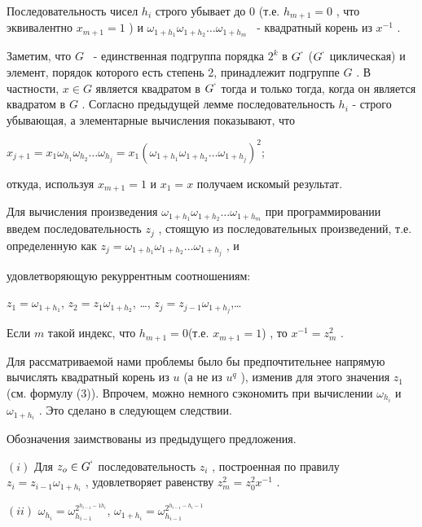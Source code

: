 \documentclass{mai_book}
\begin{document}
Последовательность чисел $h_i$
 строго убывает до 0 (т.е. $h_{m+1}=0$
    , что эквивалентно $x_{m+1}=1$
) и $\omega_{1+h_1}\omega_{1+h_2}\ldots\omega_{1+h_m}$
 ~- квадратный корень из $x^{-1}$
 .


\begin{myproof}
Заметим, что $G$
 ~- единственная подгруппа порядка $2^k$
 в $G^`$
 ($G^`$
 циклическая) и элемент, порядок которого есть степень 2, принадлежит подгруппе $G$
 . В частности, $x\in G$
 является квадратом в $G^`$
 тогда и только тогда, когда он является квадратом в $G$
 .
Согласно предыдущей лемме последовательность $h_i$
 - строго убывающая, а элементарные вычисления показывают, что

\begin{center}
$x_{j+1}= x_1\omega_{h_1}\omega_{h_2}\ldots\omega_{h_j} = x_1(\omega_{1+h_1}\omega_{1+h_2}\ldots\omega_{1+h_j})^2$;
\end{center}


откуда, используя $x_{m+1}=1$
 и $x_1=x$
 получаем искомый результат.
\end{myproof}

Для вычисления произведения $\omega_{1+h_1}\omega_{1+h_2}\ldots\omega_{1+h_m}$
 при программировании введем последовательность $z_j$
 , стоящую из последовательных произведений, т.е. определенную как $z_j = \omega_{1+h_1}\omega_{1+h_2}\ldots\omega_{1+h_j}$
, и

\newpage

удовлетворяющую рекуррентным соотношениям:

\begin{center}
$z_1 = \omega_{1+h_1}$, $z_2=z_1\omega_{1+h_2}$, \ldots, $z_j=z_{j-1}\omega_{1+h_j}$,\ldots
\end{center}


Если $m$
 такой индекс, что $h_{m+1}=0$(т.е. $x_{m+1}=1$)
 , то $x^{-1}=z_m^2$
.

Для рассматриваемой нами проблемы было бы предпочтительнее напрямую вычислять квадратный корень из $u$
 (а не из $u^q$
    ), изменив для этого значения $z_1$
 (см. формулу (3)). Впрочем, можно немного сэкономить при вычислении $\omega_{h_i}$
 и $\omega_{1+h_i}$
 . Это сделано в следующем следствии.

\begin{sled}
Обозначения заимствованы из предыдущего предложения.

$(i)$ Для $z_o\in G^`$
 последовательность $z_i$
 , построенная по правилу $z_i=z_{i-1}\omega_{1+h_i}$
, удовлетворяет равенству $z_m^2=z_0^2x^{-1}$
.

$(ii)$ $\omega_{h_i}=\omega_{h_{i-1}}^{2^{h_{i-1}-1h_i}}$, $\omega_{1+h_i}=\omega_{h_{i-1}}^{2^{h_{i-1}-h_i-1}}$ 
\end{sled}
\end{document}
